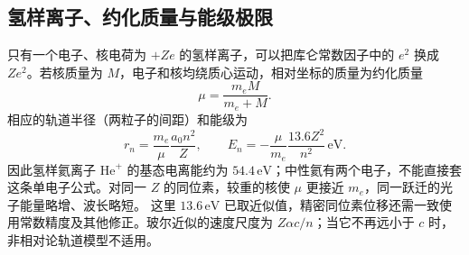 \subsection{氢样离子、约化质量与能级极限}
只有一个电子、核电荷为 $+Ze$ 的氢样离子，可以把库仑常数因子中的 $e^2$ 换成 $Ze^2$。若核质量为 $M$，电子和核均绕质心运动，相对坐标的质量为约化质量
\[
 \mu=\frac{m_eM}{m_e+M}.
\]
相应的轨道半径（两粒子的间距）和能级为
\[
 r_n=\frac{m_e}{\mu}\frac{a_0n^2}{Z},\qquad
 E_n=-\frac{\mu}{m_e}\frac{13.6Z^2}{n^2}\,\mathrm{eV}.
\]
因此氢样氦离子 $\mathrm{He}^+$ 的基态电离能约为 $54.4\,\mathrm{eV}$；中性氦有两个电子，不能直接套这条单电子公式。对同一 $Z$ 的同位素，较重的核使 $\mu$ 更接近 $m_e$，同一跃迁的光子能量略增、波长略短。
这里 $13.6\,\mathrm{eV}$ 已取近似值，精密同位素位移还需一致使用常数精度及其他修正。玻尔近似的速度尺度为 $Z\alpha c/n$；当它不再远小于 $c$ 时，非相对论轨道模型不适用。
